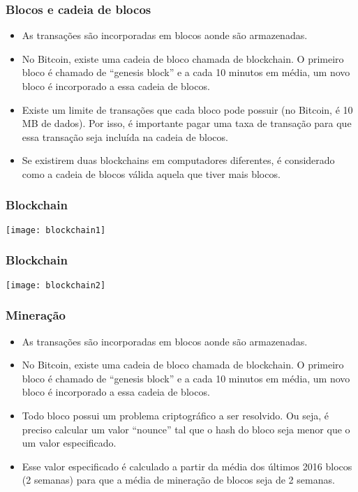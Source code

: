 \documentclass{beamer}
\begin{document}
\begin{frame}
  \frametitle{Blocos e cadeia de blocos}
  \begin{itemize}
    \item As transações são incorporadas em blocos aonde são armazenadas.
    \item No Bitcoin, existe uma cadeia de bloco chamada de blockchain.
      O primeiro bloco é chamado de \foreignquote{english}{genesis block} e
      a cada 10 minutos em média, um novo bloco é incorporado a essa cadeia de blocos.
    \item Existe um limite de transações que cada bloco pode possuir (no Bitcoin, é 10 MB de dados).
      Por isso, é importante pagar uma taxa de transação para que essa transação seja incluída na
      cadeia de blocos.
    \item Se existirem duas blockchains em computadores diferentes, é considerado
      como a cadeia de blocos válida aquela que tiver mais blocos.
  \end{itemize}
\end{frame}

\begin{frame}
\frametitle{Blockchain}
\texttt{[image: blockchain1]}
\end{frame}

\begin{frame}
\frametitle{Blockchain}
\texttt{[image: blockchain2]}
\end{frame}

\begin{frame}
  \frametitle{Mineração}
  \begin{itemize}
    \item As transações são incorporadas em blocos aonde são armazenadas.
    \item No Bitcoin, existe uma cadeia de bloco chamada de blockchain.
      O primeiro bloco é chamado de \foreignquote{english}{genesis block} e
      a cada 10 minutos em média, um novo bloco é incorporado a essa cadeia de blocos.
    \item Todo bloco possui um problema criptográfico a ser resolvido. Ou seja,
      é preciso calcular um valor \foreignquote{english}{nounce} tal que o hash do bloco
      seja menor que o um valor especificado.
    \item Esse valor especificado é calculado a partir da média dos últimos 2016 blocos (2 semanas)
      para que a média de mineração de blocos seja de 2 semanas.
  \end{itemize}
\end{frame}
\end{document}
